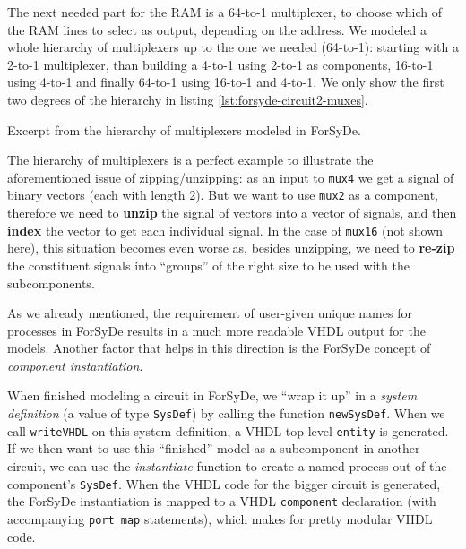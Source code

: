             The next needed part for the RAM is a 64-to-1 multiplexer, to choose which of the RAM
            lines to select as output, depending on the address. We modeled a whole hierarchy of
            multiplexers up to the one we needed (64-to-1): starting with a 2-to-1 multiplexer, than
            building a 4-to-1 using 2-to-1 as components, 16-to-1 using 4-to-1 and finally 64-to-1
            using 16-to-1 and 4-to-1. We only show the first two degrees of the hierarchy in listing
            \ref{lst:forsyde-circuit2-muxes}.

            \begin{listing}[h!]
                \caption{Excerpt from the hierarchy of multiplexers modeled in ForSyDe.
                    \label{lst:forsyde-circuit2-muxes}}
            \end{listing}

            The hierarchy of multiplexers is a perfect example to illustrate the aforementioned
            issue of zipping/unzipping: as an input to \texttt{mux4} we get a signal of binary
            vectors (each with length 2). But we want to use \texttt{mux2} as a component, therefore
            we need to \textbf{unzip} the signal of vectors into a vector of signals, and then
            \textbf{index} the vector to get each individual signal. In the case of \texttt{mux16}
            (not shown here), this situation becomes even worse as, besides unzipping, we need to
            \textbf{re-zip} the constituent signals into ``groups'' of the right size to be used
            with the subcomponents.

            As we already mentioned, the requirement of user-given unique names for processes in
            ForSyDe results in a much more readable VHDL output for the models. Another factor that
            helps in this direction is the ForSyDe concept of \emph{component instantiation}.

            When finished modeling a circuit in ForSyDe, we ``wrap it up'' in a \emph{system
                definition} (a value of type \texttt{SysDef}) by calling the function
            \texttt{newSysDef}. When we call \texttt{writeVHDL} on this system definition, a VHDL
            top-level \texttt{entity} is generated. If we then want to use this ``finished'' model
            as a subcomponent in another circuit, we can use the \emph{instantiate} function to
            create a named process out of the component's \texttt{SysDef}. When the VHDL code for
            the bigger circuit is generated, the ForSyDe instantiation is mapped to a VHDL
            \texttt{component} declaration (with accompanying \texttt{port map} statements), which
            makes for pretty modular VHDL code.


